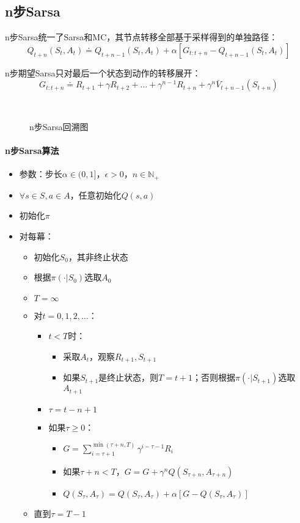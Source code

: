 \documentclass[
12pt, %
a4paper, 
oneside, %
headinclude,footinclude, %
]{scrartcl}
\begin{document}
\subsection{n步Sarsa}
n步Sarsa统一了Sarsa和MC，其节点转移全部基于采样得到的单独路径：
$$ Q_{t + n}(S_t, A_t) \doteq Q_{t + n - 1}(S_t, A_t) + \alpha [G_{t:t + n} - Q_{t + n - 1}(S_t, A_t)] $$

n步期望Sarsa只对最后一个状态到动作的转移展开：
$$ G_{t:t + n} \doteq R_{t + 1} + \gamma R_{t + 2} + \dots + \gamma^{n - 1} R_{t + n} + \gamma^n \bar{V}_{t + n - 1}(S_{t + n}) $$

\begin{figure}[H]
\centering
{} \\
\caption[n步Sarsa回溯图]{n步Sarsa回溯图}
\end{figure}
\paragraph{n步Sarsa算法}
\begin{itemize}
\item 参数：步长$ \alpha \in (0,1] $，$ \epsilon > 0 $，$ n \in \mathbb{N}_+ $
\item $ \forall s \in S, a \in A $，任意初始化$ Q(s, a) $
\item 初始化$ \pi $
\item 对每幕：
\begin{itemize}
\item 初始化$ S_0 $，其非终止状态
\item 根据$ \pi(\cdot|S_0) $选取$ A_0 $
\item $ T = \infty $
\item 对$ t = 0, 1, 2, \dots $：
\begin{itemize}
\item $ t < T $时：
\begin{itemize}
\item 采取$ A_t $，观察$ R_{t + 1}, S_{t + 1} $
\item 如果$ S_{t + 1} $是终止状态，则$ T = t + 1 $；否则根据$ \pi(\cdot|S_{t + 1}) $选取$ A_{t + 1} $
\end{itemize}
\item $ \tau = t - n + 1 $
\item 如果$ \tau \geq 0 $：
\begin{itemize}
\item $ G = \sum_{i = \tau + 1}^{\min(\tau + n, T)} \gamma^{i - \tau - 1}R_i $
\item 如果$ \tau + n < T $，$ G = G + \gamma^n Q(S_{\tau + n}, A_{\tau + n}) $
\item $ Q(S_{\tau},A_{\tau}) = Q(S_{\tau},A_{\tau}) + \alpha[G - Q(S_{\tau},A_{\tau})] $
\end{itemize}
\end{itemize}
\item 直到$ \tau = T - 1 $
\end{itemize}
\end{itemize}
\end{document}
